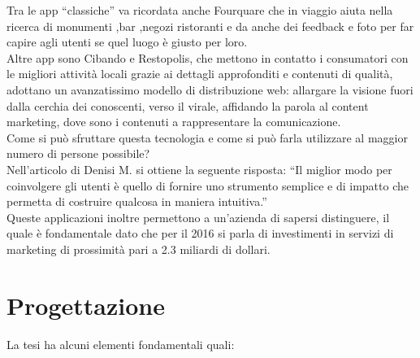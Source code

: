 Tra le app “classiche” va ricordata anche Fourquare che in viaggio aiuta nella ricerca di monumenti ,bar ,negozi ristoranti e da anche dei feedback e foto per far capire agli utenti se quel luogo è giusto per loro.\\

Altre app sono Cibando e Restopolis, che mettono in contatto i consumatori con le migliori attività locali grazie ai dettagli approfonditi e contenuti di qualità, adottano un avanzatissimo modello di distribuzione web: allargare la visione fuori dalla cerchia dei conoscenti, verso il virale, affidando la parola al content marketing, dove sono i contenuti a rappresentare la comunicazione.\\

Come si può sfruttare questa tecnologia e come si può farla utilizzare al maggior numero di persone possibile?\\
Nell'articolo di Denisi M. \cite{rif14} si ottiene la seguente risposta: “Il miglior modo per coinvolgere gli utenti è quello di fornire uno strumento semplice e di impatto che permetta di costruire qualcosa in maniera intuitiva.”\\

Queste applicazioni inoltre permettono a un'azienda di sapersi distinguere, il quale è fondamentale dato che per il 2016 si parla di investimenti in servizi di marketing di prossimità pari a 2.3 miliardi di dollari.\\


\chapter{Progettazione}

La tesi ha alcuni elementi fondamentali quali:\\[0.2cm]


